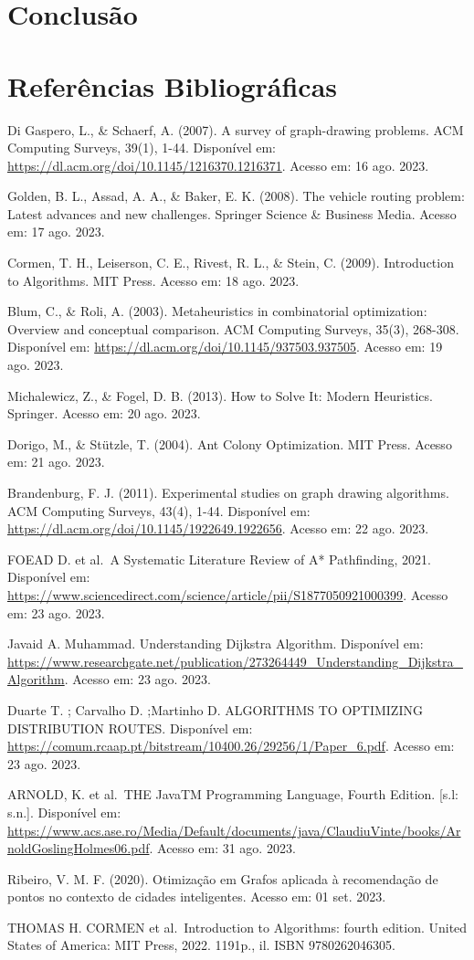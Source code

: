 \section{Conclusão}\label{conclusuxe3o}

\section{Referências
Bibliográficas}\label{referuxeancias-bibliogruxe1ficas}

Di Gaspero, L., \& Schaerf, A. (2007). A survey of graph-drawing
problems. ACM Computing Surveys, 39(1), 1-44. Disponível em:
\url{https://dl.acm.org/doi/10.1145/1216370.1216371}. Acesso em: 16 ago.
2023.

Golden, B. L., Assad, A. A., \& Baker, E. K. (2008). The vehicle routing
problem: Latest advances and new challenges. Springer Science \&
Business Media. Acesso em: 17 ago. 2023.

Cormen, T. H., Leiserson, C. E., Rivest, R. L., \& Stein, C. (2009).
Introduction to Algorithms. MIT Press. Acesso em: 18 ago. 2023.

Blum, C., \& Roli, A. (2003). Metaheuristics in combinatorial
optimization: Overview and conceptual comparison. ACM Computing Surveys,
35(3), 268-308. Disponível em:
\url{https://dl.acm.org/doi/10.1145/937503.937505}. Acesso em: 19 ago.
2023.

Michalewicz, Z., \& Fogel, D. B. (2013). How to Solve It: Modern
Heuristics. Springer. Acesso em: 20 ago. 2023.

Dorigo, M., \& Stützle, T. (2004). Ant Colony Optimization. MIT Press.
Acesso em: 21 ago. 2023.

Brandenburg, F. J. (2011). Experimental studies on graph drawing
algorithms. ACM Computing Surveys, 43(4), 1-44. Disponível em:
\url{https://dl.acm.org/doi/10.1145/1922649.1922656}. Acesso em: 22 ago.
2023.

FOEAD D. et al.~A Systematic Literature Review of A* Pathfinding, 2021.
Disponível em:
\url{https://www.sciencedirect.com/science/article/pii/S1877050921000399}.
Acesso em: 23 ago. 2023.

Javaid A. Muhammad. Understanding Dijkstra Algorithm. Disponível em:
\url{https://www.researchgate.net/publication/273264449_Understanding_Dijkstra_Algorithm}.
Acesso em: 23 ago. 2023.

Duarte T. ; Carvalho D. ;Martinho D. ALGORITHMS TO OPTIMIZING
DISTRIBUTION ROUTES. Disponível em:
\url{https://comum.rcaap.pt/bitstream/10400.26/29256/1/Paper_6.pdf}.
Acesso em: 23 ago. 2023.

ARNOLD, K. et al.~THE JavaTM Programming Language, Fourth Edition.
{[}s.l: s.n.{]}. Disponível em:
\url{https://www.acs.ase.ro/Media/Default/documents/java/ClaudiuVinte/books/ArnoldGoslingHolmes06.pdf}.
Acesso em: 31 ago. 2023.

Ribeiro, V. M. F. (2020). Otimização em Grafos aplicada à recomendação
de pontos no contexto de cidades inteligentes. Acesso em: 01 set. 2023.

THOMAS H. CORMEN et al.~Introduction to Algorithms: fourth edition.
United States of America: MIT Press, 2022. 1191p., il. ISBN
9780262046305.
